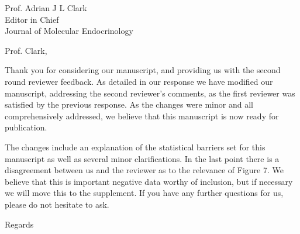 \documentclass[a4paper,12pt]{letter}
\begin{document}
\begin{letter}{Prof. Adrian J L Clark \\
Editor in Chief\\
Journal of Molecular Endocrinology }

\opening{} %

Prof. Clark,

Thank you for considering our manuscript, and providing us with the second round reviewer feedback.  As detailed in our response we have modified our manuscript, addressing the second reviewer's comments, as the first reviewer was satisfied by the previous response.  As the changes were minor and all comprehensively addressed, we believe that this manuscript is now ready for publication.

The changes include an explanation of the statistical barriers set for this manuscript as well as several minor clarifications.  In the last point there is a disagreement between us and the reviewer as to the relevance of Figure 7.  We believe that this is important negative data worthy of inclusion, but if necessary we will move this to the supplement.  If you have any further questions for us, please do not hesitate to ask.


\closing{Regards} %


\end{letter}
\end{document}
